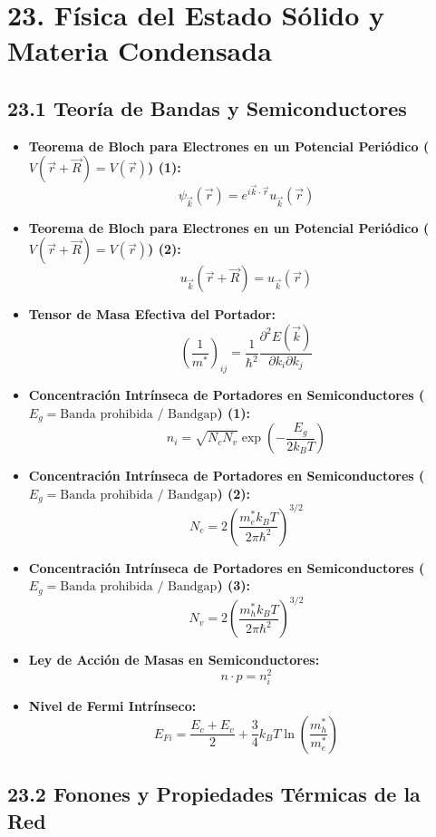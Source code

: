 \documentclass[11pt,a4paper]{article}
\begin{document}
\section*{23. Física del Estado Sólido y Materia Condensada}

\subsection*{23.1 Teoría de Bandas y Semiconductores}

\begin{itemize}
  \item \textbf{Teorema de Bloch para Electrones en un Potencial Periódico ($V(\vec{r} + \vec{R}) = V(\vec{r})$) (1):}
  \[
    \psi_{\vec{k}}(\vec{r}) = e^{i\vec{k} \cdot \vec{r}} u_{\vec{k}}(\vec{r})
  \]
  \item \textbf{Teorema de Bloch para Electrones en un Potencial Periódico ($V(\vec{r} + \vec{R}) = V(\vec{r})$) (2):}
  \[
    u_{\vec{k}}(\vec{r} + \vec{R}) = u_{\vec{k}}(\vec{r})
  \]
  \item \textbf{Tensor de Masa Efectiva del Portador:}
  \[
    \left( \frac{1}{m^*} \right)_{ij} = \frac{1}{\hbar^2} \frac{\partial^2 E(\vec{k})}{\partial k_i \partial k_j}
  \]
  \item \textbf{Concentración Intrínseca de Portadores en Semiconductores ($E_g = \text{Banda prohibida / Bandgap}$) (1):}
  \[
    n_i = \sqrt{N_c N_v} \exp\left( -\frac{E_g}{2 k_B T} \right)
  \]
  \item \textbf{Concentración Intrínseca de Portadores en Semiconductores ($E_g = \text{Banda prohibida / Bandgap}$) (2):}
  \[
    N_c = 2\left( \frac{m_e^* k_B T}{2\pi\hbar^2} \right)^{3/2}
  \]
  \item \textbf{Concentración Intrínseca de Portadores en Semiconductores ($E_g = \text{Banda prohibida / Bandgap}$) (3):}
  \[
    N_v = 2\left( \frac{m_h^* k_B T}{2\pi\hbar^2} \right)^{3/2}
  \]
  \item \textbf{Ley de Acción de Masas en Semiconductores:}
  \[
    n \cdot p = n_i^2
  \]
  \item \textbf{Nivel de Fermi Intrínseco:}
  \[
    E_{Fi} = \frac{E_c + E_v}{2} + \frac{3}{4} k_B T \ln\left( \frac{m_h^*}{m_e^*} \right)
  \]
\end{itemize}

\subsection*{23.2 Fonones y Propiedades Térmicas de la Red}
\end{document}
